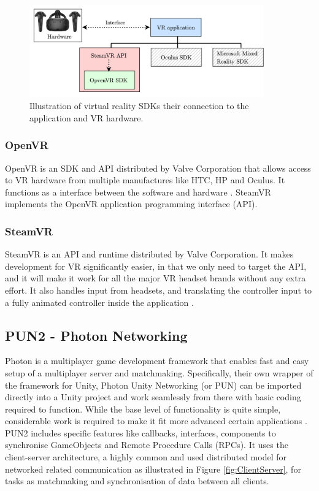 \begin{figure}[!ht]
    \centering
    \includegraphics[width=0.9\textwidth]{./fig/background/VR_sdk.png}
    \caption{Illustration of virtual reality SDKs their connection to the application and VR hardware. }
    \label{fig:vr_sdk}
\end{figure}

\subsubsection{OpenVR}
OpenVR is an SDK and API distributed by Valve Corporation that allows access to VR hardware from multiple manufactures like HTC, HP and Oculus. It functions as a interface between the software and hardware \cite{openVRsdk}. SteamVR implements the OpenVR application programming interface (API).  

\subsubsection{SteamVR}
SteamVR is an API and runtime distributed by Valve Corporation. It makes development for VR significantly easier, in that we only need to target the API, and it will make it work for all the major VR headset brands without any extra effort. It also handles input from headsets, and translating the controller input to a fully animated controller inside the application \cite{steamVR}\cite{steamVRAPI}.

\subsection{PUN2 - Photon Networking}
\label{section:pun2}
Photon is a multiplayer game development framework that enables fast and easy setup of a multiplayer server and matchmaking. Specifically, their own wrapper of the framework for Unity, Photon Unity Networking (or PUN) can be imported directly into a Unity project and work seamlessly from there with basic coding required to function. While the base level of functionality is quite simple, considerable work is required to make it fit more advanced certain applications \cite{PUN}. PUN2 includes specific features like callbacks, interfaces, components to synchronise GameObjects and Remote Procedure Calls (RPCs). It uses the client-server architecture, a highly common and used distributed model for networked related communication as illustrated in Figure \ref{fig:ClientServer}, for tasks as matchmaking and synchronisation of data between all clients. 

